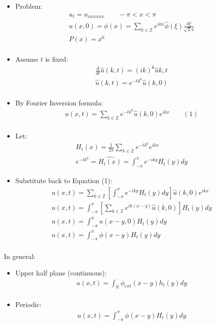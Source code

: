 \documentclass[12pt, a4paper]{article}
\begin{document}
\begin{itemize}
    \item Problem:
    \begin{gather*}
        u_t = u_{xxxxxx} \qquad -\pi < x < \pi\\
        u(x, 0) = \phi(x) = \sum_{k \in \mathbb{Z}} e^{ikx}\hat{\phi}(\xi)\frac{d\xi}{\sqrt{2}\pi}\\
        P(x) = x^6\\
    \end{gather*}
    \item Assume $t$ is fixed:
    \begin{gather*}
        \frac{d}{dt} \hat{u}(k, t) =(ik)^6\hat{u}{k, t} \\
        \hat{u}(k, t) = e^{-tk^6}\hat{u}(k, 0) \\
    \end{gather*}
    \item By Fourier Inversion formula:
    \begin{gather*}
        u(x, t) = \sum_{k \in \mathbb{Z}} e^{-tk^6}\hat{u}(k, 0)e^{ikx} \qquad (1)\\
    \end{gather*}
    \item Let:
    \begin{gather*}
        H_t(x) = \frac{1}{2\pi}\sum_{k \in  \mathbb{Z}} e^{-tk^6}e^{ikx}\\
        e^{-tk^6} = \hat{H_t(x)} = \int_{-\pi}^{\pi}e^{-iky}H_t(y)dy
    \end{gather*}
    \item Substitute back to Equation (1):
    \begin{gather*}
        u(x, t) = \sum_{k \in \mathbb{Z}} \left[\int_{-\pi}^{\pi}e^{-iky}H_t(y)dy\right]\hat{u}(k, 0)e^{ikx}\\ 
        u(x, t) = \int_{-\pi}^{\pi}\left[\sum_{k \in \mathbb{Z}} e^{ik(x-y)}\hat{u}(k, 0)\right]H_t(y)dy\\
        u(x, t) = \int_{-\pi}^{\pi}u(x-y, 0)H_t(y)dy\\
        u(x, t) = \int_{-\pi}^{\pi}\phi(x-y)H_t(y)dy\\
    \end{gather*}
\end{itemize}
In general:
\begin{itemize}
    \item Upper half plane (continuous):
    \begin{gather*}
        u(x, t) = \int_{\mathbb{R}} \phi_{ext}(x-y) h_t(y)dy\\
    \end{gather*}
    \item Periodic:
    \begin{gather*}
        u(x, t) = \int_{-\pi}^{\pi}\phi(x-y)H_t(y)dy\\
    \end{gather*}
\end{itemize}
\end{document}
